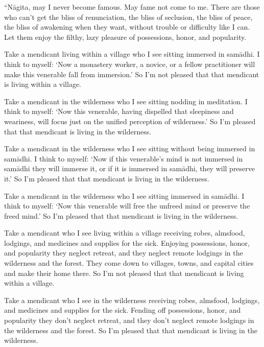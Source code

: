 \documentclass[12pt,openany]{book}%
\begin{document}
“\textsanskrit{Nāgita}, may I never become famous. May fame not come to me. There are those who can’t get the bliss of renunciation, the bliss of seclusion, the bliss of peace, the bliss of awakening when they want, without trouble or difficulty like I can. Let them enjoy the filthy, lazy pleasure of possessions, honor, and popularity. 

Take a mendicant living within a village who I see sitting immersed in \textsanskrit{samādhi}. I think to myself: ‘Now a monastery worker, a novice, or a fellow practitioner will make this venerable fall from immersion.’ So I’m not pleased that that mendicant is living within a village. 

Take a mendicant in the wilderness who I see sitting nodding in meditation. I think to myself: ‘Now this venerable, having dispelled that sleepiness and weariness, will focus just on the unified perception of wilderness.’ So I’m pleased that that mendicant is living in the wilderness. 

Take a mendicant in the wilderness who I see sitting without being immersed in \textsanskrit{samādhi}. I think to myself: ‘Now if this venerable’s mind is not immersed in \textsanskrit{samādhi} they will immerse it, or if it is immersed in \textsanskrit{samādhi}, they will preserve it.’ So I’m pleased that that mendicant is living in the wilderness. 

Take a mendicant in the wilderness who I see sitting immersed in \textsanskrit{samādhi}. I think to myself: ‘Now this venerable will free the unfreed mind or preserve the freed mind.’ So I’m pleased that that mendicant is living in the wilderness. 

Take a mendicant who I see living within a village receiving robes, almsfood, lodgings, and medicines and supplies for the sick. Enjoying possessions, honor, and popularity they neglect retreat, and they neglect remote lodgings in the wilderness and the forest. They come down to villages, towns, and capital cities and make their home there. So I’m not pleased that that mendicant is living within a village. 

Take a mendicant who I see in the wilderness receiving robes, almsfood, lodgings, and medicines and supplies for the sick. Fending off possessions, honor, and popularity they don’t neglect retreat, and they don’t neglect remote lodgings in the wilderness and the forest. So I’m pleased that that mendicant is living in the wilderness. 
\end{document}
